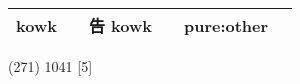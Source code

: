 \documentclass[14pt,a4paper]{scrartcl}
\begin{document}
\begin{longtable}[c]{@{}llllll@{}}
\begin{minipage}[t]{0.14\columnwidth}\raggedright\strut
kowk
\strut\end{minipage} &
\begin{minipage}[t]{0.14\columnwidth}\raggedright\strut
\strut\end{minipage} &
\begin{minipage}[t]{0.14\columnwidth}\raggedright\strut
告 kowk
\strut\end{minipage} &
\begin{minipage}[t]{0.14\columnwidth}\raggedright\strut
\strut\end{minipage} &
\begin{minipage}[t]{0.14\columnwidth}\raggedright\strut
pure:other
\strut\end{minipage}\tabularnewline
\bottomrule
\end{longtable}

(271) 1041 {[}5{]}
\end{document}
